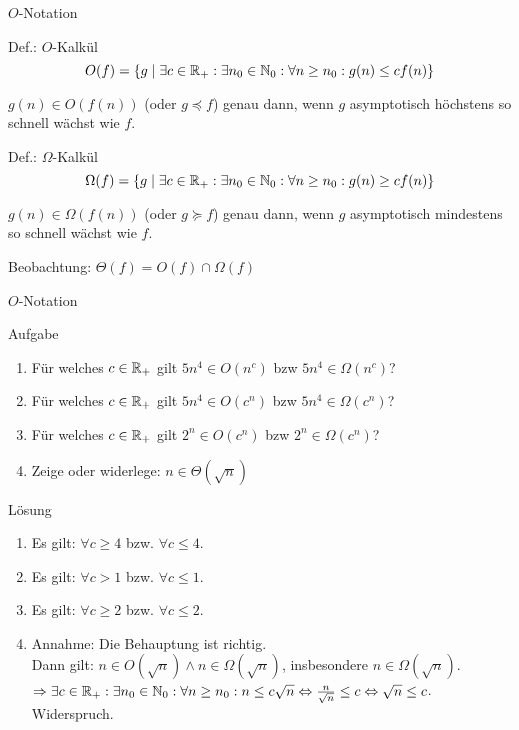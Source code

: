 \begin{frame}{$O$-Notation}
    \begin{block}{Def.: $O$-Kalkül}
    	\[
    		O(f) = \{ g \mid \exists c\in \mathbb{R}_+:\exists n_0\in\mathbb{N}_0: \forall n\geq n_0: g(n) \leq c f(n)\}
    	\]

    	$g(n) \in O(f(n))$ (oder $g \preceq f$) genau dann, wenn $g$ asymptotisch höchstens so schnell wächst wie $f$.
    \end{block}
\pause
    \begin{block}{Def.: $\Omega$-Kalkül}
    	\[
    		\Omega(f) = \{ g \mid \exists c\in \mathbb{R}_+:\exists n_0\in\mathbb{N}_0: \forall n\geq n_0: g(n) \geq c f(n)\}
    	\]
    	
    	$g(n) \in \Omega(f(n))$ (oder $g \succeq f$) genau dann, wenn $g$ asymptotisch mindestens so schnell wächst wie $f$.
    \end{block}
\pause
    Beobachtung: $\Theta(f) = O(f) \cap \Omega(f)$
\end{frame}

\begin{frame}{$O$-Notation}
	\begin{exampleblock}{Aufgabe}
		\begin{enumerate}
			\item Für welches $c \in \mathbb{R}_+$ gilt $5n^4 \in O(n^c)$ bzw $5n^4 \in \Omega(n^c)$?
			\item Für welches $c \in \mathbb{R}_+$ gilt $5n^4 \in O(c^n)$ bzw $5n^4 \in \Omega(c^n)$?
			\item Für welches $c \in \mathbb{R}_+$ gilt $2^n \in O(c^n)$ bzw $2^n \in \Omega(c^n)$?
			\item Zeige oder widerlege: $n \in \Theta(\sqrt{n})$
		\end{enumerate}
	\end{exampleblock}
\pause
	\begin{block}{Lösung}
		\begin{enumerate}
			\item Es gilt: $\forall c \geq 4$ bzw. $\forall c \leq 4$.
			\item Es gilt: $\forall c > 1$ bzw. $\forall c \leq 1$.
			\item Es gilt: $\forall c \geq 2$ bzw. $\forall c \leq 2$.
			\item \small Annahme: Die Behauptung ist richtig.\\
				Dann gilt: $n \in O(\sqrt{n}) \wedge n \in \Omega(\sqrt{n})$, insbesondere $n \in \Omega(\sqrt{n})$.\\
				$\Rightarrow \exists c\in \mathbb{R}_+:\exists n_0\in\mathbb{N}_0: \forall n\geq n_0: n \leq c \sqrt{n} \Leftrightarrow \frac{n}{\sqrt{n}} \leq c \Leftrightarrow \sqrt{n} \leq c$. Widerspruch.
				
		\end{enumerate}
	\end{block}
\end{frame}

